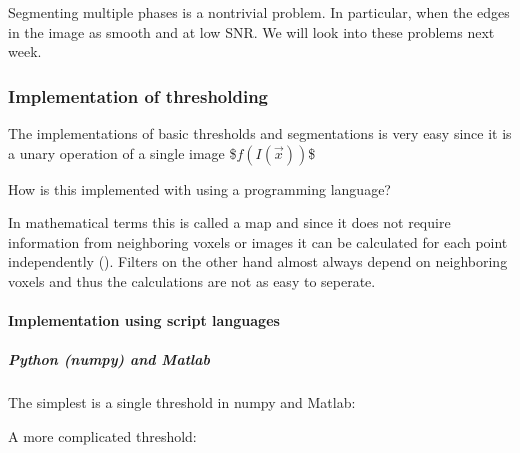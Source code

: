 \documentclass[letterpaper,10pt,english]{sphinxmanual}
\begin{document}
\noindent{}

\sphinxAtStartPar
Segmenting multiple phases is a non\sphinxhyphen{}trivial problem. In particular, when the edges in the image as smooth and at low SNR. We will look into these problems next week.


\subsubsection{Implementation of thresholding}
\label{\detokenize{04-BasicSegmentation_Part2:implementation-of-thresholding}}
\sphinxAtStartPar
The implementations of basic thresholds and segmentations is very easy since it is a unary operation of a single image
\$\( f(I(\vec{x})) \)\$

\sphinxAtStartPar
How is this implemented with using a programming language?

\sphinxAtStartPar
In mathematical terms this is called a map and since it does not require information from neighboring voxels or images it can be calculated for each point independently (). Filters on the other hand almost always depend on neighboring voxels and thus the calculations are not as easy to seperate.


\paragraph{Implementation using script languages}
\label{\detokenize{04-BasicSegmentation_Part2:implementation-using-script-languages}}

\subparagraph{Python (numpy) and Matlab}
\label{\detokenize{04-BasicSegmentation_Part2:python-numpy-and-matlab}}
\sphinxAtStartPar
The simplest is a single threshold in numpy and Matlab:

\begin{sphinxVerbatim}[commandchars=\\\{\}]
\end{sphinxVerbatim}

\sphinxAtStartPar
A more complicated threshold:

\begin{sphinxVerbatim}[commandchars=\\\{\}]
        
\end{sphinxVerbatim}
\end{document}
